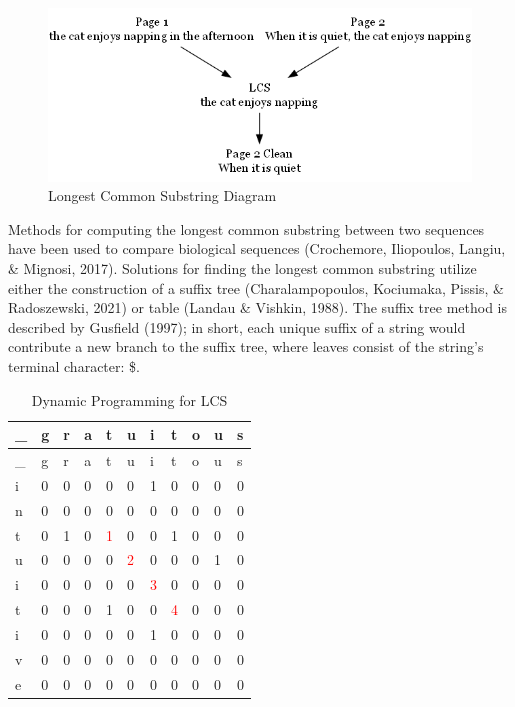 \documentclass[print]{nuthesis}
\begin{document}
\begin{figure}

{\centering \includegraphics[width=\linewidth]{images/svg_graph} 

}

\caption{Longest Common Substring Diagram}\label{fig:lcs}
\end{figure}

Methods for computing the longest common substring between two sequences have been used to compare biological sequences (Crochemore, Iliopoulos, Langiu, \& Mignosi, 2017).
Solutions for finding the longest common substring utilize either the construction of a suffix tree (Charalampopoulos, Kociumaka, Pissis, \& Radoszewski, 2021) or table (Landau \& Vishkin, 1988).
The suffix tree method is described by Gusfield (1997); in short, each unique suffix of a string would contribute a new branch to the suffix tree, where leaves consist of the string's terminal character: \$.

\begin{longtable}[]{@{}lllllllllll@{}}
\caption{Dynamic Programming for LCS \label{tab:dylcs}}\tabularnewline
\toprule\noalign{}
\_ & g & r & a & t & u & i & t & o & u & s \\
\midrule\noalign{}
\endfirsthead
\toprule\noalign{}
\_ & g & r & a & t & u & i & t & o & u & s \\
\midrule\noalign{}
\endhead
\bottomrule\noalign{}
\endlastfoot
i & 0 & 0 & 0 & 0 & 0 & 1 & 0 & 0 & 0 & 0 \\
n & 0 & 0 & 0 & 0 & 0 & 0 & 0 & 0 & 0 & 0 \\
t & 0 & 1 & 0 & \textcolor{red}{1} & 0 & 0 & 1 & 0 & 0 & 0 \\
u & 0 & 0 & 0 & 0 & \textcolor{red}{2} & 0 & 0 & 0 & 1 & 0 \\
i & 0 & 0 & 0 & 0 & 0 & \textcolor{red}{3} & 0 & 0 & 0 & 0 \\
t & 0 & 0 & 0 & 1 & 0 & 0 & \textcolor{red}{4} & 0 & 0 & 0 \\
i & 0 & 0 & 0 & 0 & 0 & 1 & 0 & 0 & 0 & 0 \\
v & 0 & 0 & 0 & 0 & 0 & 0 & 0 & 0 & 0 & 0 \\
e & 0 & 0 & 0 & 0 & 0 & 0 & 0 & 0 & 0 & 0 \\
\end{longtable}
\end{document}
